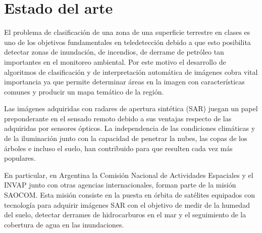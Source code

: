 \documentclass[11pt]{article}
\begin{document}
\section{Estado del arte}

El problema de clasificación de una zona de una superficie terrestre en clases es uno de los objetivos fundamentales en teledetección debido a que esto posibilita detectar zonas de inundación, de incendios, de derrame de petróleo tan importantes en el monitoreo ambiental. 
Por este motivo el desarrollo de algoritmos de clasificación y de interpretación automática de imágenes cobra vital importancia  ya que permite determinar áreas en la imagen con características comunes  y producir un mapa temático de la región. 

Las imágenes adquiridas con radares de apertura sintética (SAR) juegan un papel preponderante en el sensado remoto debido a sus ventajas respecto de las adquiridas por sensores ópticos. La independencia de las condiciones climáticas y de la iluminación junto con la capacidad de penetrar la nubes, las copas de los árboles e incluso el suelo, han contribuido para que resulten cada vez más populares. 

En particular, en Argentina la Comisión Nacional de Actividades Espaciales y el INVAP junto con otras agencias internacionales, forman parte de la misión SAOCOM. Esta misión consiste en la puesta en órbita de satélites equipados con tecnología para adquirir imágenes SAR con el objetivo de medir de la humedad del suelo, detectar derrames de hidrocarburos en el mar y el seguimiento de la cobertura de agua en las inundaciones. 
\end{document}
